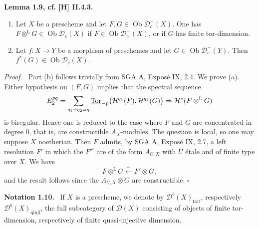 \documentclass[11pt]{article}
\theoremstyle{plain}
\theoremstyle{definition}
\theoremstyle{remark}
\newenvironment{statement}[1]{\par\medskip\noindent\textbf{#1.}\ }{\par\medskip}
\newenvironment{prooftext}{\par\noindent\textit{Proof.}\ }{\par\medskip}
\newcommand{\D}{\mathcal D}\newcommand{\E}{\mathcal E}\newcommand{\F}{\mathcal F}
\DeclareMathOperator{\Tor}{Tor}
\DeclareMathOperator{\ob}{Ob}
\newcommand{\qedtext}{\hfill$\square$}
\begin{document}
\begin{statement}{Lemma 1.9, cf. [H] II.4.3}
\begin{enumerate}[label=\alph*)]
\item Let $X$ be a prescheme and let $F,G\in\ob\D_c^-(X)$. One has $F\otimes^{\mathrm L}G\in\ob\D_c(X)$ if $F\in\ob\D_c^-(X)$, or if $G$ has finite tor-dimension.
\item Let $f:X\to Y$ be a morphism of preschemes and let $G\in\ob\D_c^-(Y)$. Then $f^*(G)\in\ob\D_c(X)$.
\end{enumerate}
\end{statement}

\begin{prooftext}
Part (b) follows trivially from SGA A, Exposé IX, 2.4. We prove (a). Either hypothesis on $(F,G)$ implies that the spectral sequence
\[
   E_2^{pq}=\sum_{q_1+q_2=q}\underline{\Tor}_{-p}\bigl(\Hh^{q_1}(F),\Hh^{q_2}(G)\bigr)
       \Rightarrow \Hh^*(F\otimes^{\mathrm L}G)
\]
is biregular. Hence one is reduced to the case where $F$ and $G$ are concentrated in degree $0$, that is, are constructible $A_X$-modules. The question is local, so one may suppose $X$ noetherian. Then $F$ admits, by SGA A, Exposé IX, 2.7, a left resolution $F'$ in which the $F'^i$ are of the form $A_{U,X}$ with $U$ étale and of finite type over $X$. We have
\[
   F\otimes^{\mathrm L}G\xleftarrow{\sim}F'\otimes G,
\]
and the result follows since the $A_{U,X}\otimes G$ are constructible. \qedtext
\end{prooftext}

\begin{statement}{Notation 1.10}
If $X$ is a prescheme, we denote by $\D^b(X)_{\mathrm{torf}}$, respectively $\D^b(X)_{\mathrm{qinjf}}$, the full subcategory of $\D(X)$ consisting of objects of finite tor-dimension, respectively of finite quasi-injective dimension.
\end{statement}
\end{document}
